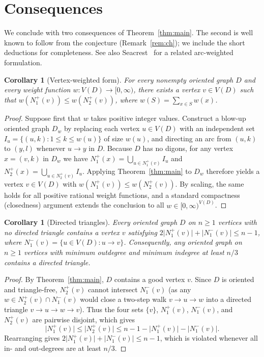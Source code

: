 \documentclass[11pt]{amsart}
\newtheorem{corollary}[theorem]{Corollary}
\theoremstyle{remark}
\newcommand{\abs}[1]{\lvert #1\rvert}
\begin{document}
\section{Consequences}\label{sec:consequences}

We conclude with two consequences of Theorem~\ref{thm:main}. The second is well known to follow from the conjecture (Remark~\ref{rem:ch}); we include the short deductions for completeness. See also Seacrest~\cite{Seacrest2015} for a related arc-weighted formulation.

\begin{corollary}[Vertex-weighted form]\label{cor:weighted}
For every nonempty oriented graph $D$ and every weight function $w\colon V(D)\to[0,\infty)$, there exists a vertex $v\in V(D)$ such that $w(N_1^+(v))\le w(N_2^+(v))$, where $w(S)=\sum_{x\in S}w(x)$.
\end{corollary}

\begin{proof}
Suppose first that $w$ takes positive integer values. Construct a blow-up oriented graph $D_w$ by replacing each vertex $u\in V(D)$ with an independent set $I_u=\{(u,k):1\le k\le w(u)\}$ of size $w(u)$, and directing an arc from $(u,k)$ to $(y,l)$ whenever $u\to y$ in $D$. Because $D$ has no digons, for any vertex $x=(v,k)$ in $D_w$ we have $N_1^+(x)=\bigcup_{u\in N_1^+(v)}I_u$ and $N_2^+(x)=\bigcup_{u\in N_2^+(v)}I_u$. Applying Theorem~\ref{thm:main} to $D_w$ therefore yields a vertex $v\in V(D)$ with $w(N_1^+(v))\le w(N_2^+(v))$. By scaling, the same holds for all positive rational weight functions, and a standard compactness (closedness) argument extends the conclusion to all $w\in[0,\infty)^{V(D)}$.
\end{proof}

\begin{corollary}[Directed triangles]\label{cor:triangle}
Every oriented graph $D$ on $n\ge1$ vertices with no directed triangle contains a vertex $v$ satisfying $2\abs{N_1^+(v)}+\abs{N_1^-(v)}\le n-1$, where $N_1^-(v)=\{u\in V(D):u\to v\}$. Consequently, any oriented graph on $n\ge1$ vertices with minimum outdegree and minimum indegree at least $n/3$ contains a directed triangle.
\end{corollary}

\begin{proof}
By Theorem~\ref{thm:main}, $D$ contains a good vertex $v$. Since $D$ is oriented and triangle-free, $N_2^+(v)$ cannot intersect $N_1^-(v)$ (as any $w\in N_2^+(v)\cap N_1^-(v)$ would close a two-step walk $v\to u\to w$ into a directed triangle $v\to u\to w\to v$). Thus the four sets $\{v\}$, $N_1^+(v)$, $N_1^-(v)$, and $N_2^+(v)$ are pairwise disjoint, which gives
\[
  \abs{N_1^+(v)}\le\abs{N_2^+(v)}\le n-1-\abs{N_1^+(v)}-\abs{N_1^-(v)}.
\]
Rearranging gives $2\abs{N_1^+(v)}+\abs{N_1^-(v)}\le n-1$, which is violated whenever all in- and out-degrees are at least $n/3$.
\end{proof}
\end{document}
